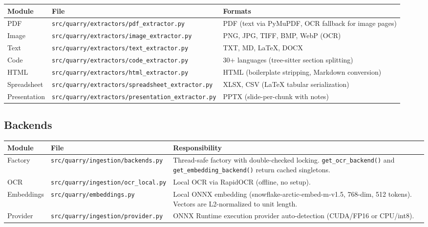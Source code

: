 \documentclass[a4paper,10pt]{article}
\newcommand{\modpath}[1]{\texttt{src/quarry/#1}}
\begin{document}
\begin{center}
\begin{tabular}{llp{6cm}}
\toprule
\textbf{Module} & \textbf{File} & \textbf{Formats} \\
\midrule
PDF           & \modpath{extractors/pdf\_extractor.py}          & PDF
                (text via PyMuPDF, OCR fallback for image pages) \\
Image         & \modpath{extractors/image\_extractor.py}        & PNG,
                JPG, TIFF, BMP, WebP (OCR) \\
Text          & \modpath{extractors/text\_extractor.py}         & TXT,
                MD, LaTeX, DOCX \\
Code          & \modpath{extractors/code\_extractor.py}         & 30+
                languages (tree-sitter section splitting) \\
HTML          & \modpath{extractors/html\_extractor.py}         & HTML
                (boilerplate stripping, Markdown conversion) \\
Spreadsheet   & \modpath{extractors/spreadsheet\_extractor.py}  & XLSX,
                CSV (LaTeX tabular serialization) \\
Presentation  & \modpath{extractors/presentation\_extractor.py} & PPTX
                (slide-per-chunk with notes) \\
\bottomrule
\end{tabular}
\end{center}

\subsection{Backends}

\begin{center}
\begin{tabular}{llp{7cm}}
\toprule
\textbf{Module} & \textbf{File} & \textbf{Responsibility} \\
\midrule
Factory     & \modpath{ingestion/backends.py}  & Thread-safe factory
              with double-checked locking.  \texttt{get\_ocr\_backend()}
              and \texttt{get\_embedding\_backend()} return cached
              singletons. \\
OCR         & \modpath{ingestion/ocr\_local.py} & Local OCR via RapidOCR
              (offline, no setup). \\
Embeddings  & \modpath{embeddings.py}          & Local ONNX embedding
              (snowflake-arctic-embed-m-v1.5, 768-dim, 512 tokens).
              Vectors are L2-normalized to unit length. \\
Provider    & \modpath{ingestion/provider.py}  & ONNX Runtime execution
              provider auto-detection (CUDA/FP16 or CPU/int8). \\
\bottomrule
\end{tabular}
\end{center}
\end{document}
